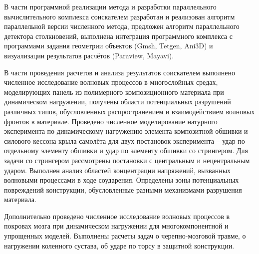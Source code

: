 В части программной реализации метода и разработки параллельного вычислительного комплекса соискателем разработан и реализован алгоритм параллельной версии численного метода, предложен алгоритм параллельного детектора столкновений, выполнена интеграция программного комплекса с программами задания геометрии объектов (Gmsh, Tetgen, Ani3D) и визуализации результатов расчётов (Paraview, Mayavi).

В части проведения расчетов и анализа результатов соискателем выполнено численное исследование волновых процессов в многослойных средах, моделирующих панель из полимерного композиционного материала при динамическом нагружении, получены области потенциальных разрушений различных типов, обусловленных распространением и взаимодействием волновых фронтов в материале. Проведено численное моделирование натурного эксперимента по динамическому нагружению элемента композитной обшивки и силового кессона крыла самолёта для двух постановок эксперимента -- удар по отдельному элементу обшивки и удар по элементу обшивки со стрингером. Для задачи со стрингером рассмотрены постановки с центральным и нецентральным ударом. Выполнен анализ областей концентрации напряжений, вызванных волновыми процессами в ходе соударения. Определены зоны потенциальных повреждений конструкции, обусловленные разными механизмами разрушения материала.

Дополнительно проведено численное исследование волновых процессов в покровах мозга при динамическом нагружении для многокомпонентной и упрощенных моделей. Выполнены расчеты задач о черепно-мозговой травме, о нагружении коленного сустава, об ударе по торсу в защитной конструкции.
